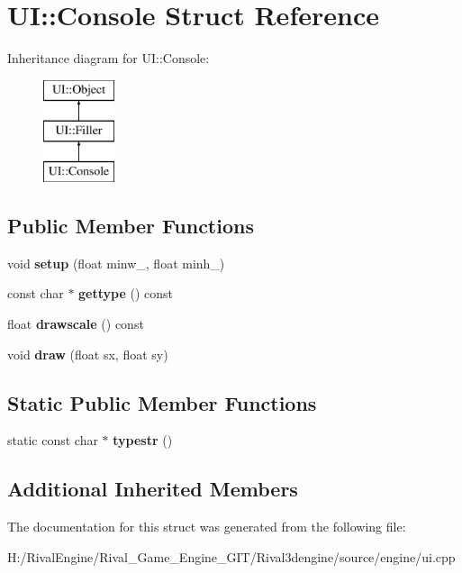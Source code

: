 \hypertarget{struct_u_i_1_1_console}{}\section{UI\+:\+:Console Struct Reference}
\label{struct_u_i_1_1_console}
Inheritance diagram for UI\+:\+:Console\+:\begin{figure}[H]
\begin{center}
\leavevmode
\includegraphics[height=3.000000cm]{struct_u_i_1_1_console}
\end{center}
\end{figure}
\subsection*{Public Member Functions}
\begin{DoxyCompactItemize}
\item 
\mbox{\label{struct_u_i_1_1_console_a6a0e13ebd65794e88fe84ae63133dd8f}} 
void {\bfseries setup} (float minw\+\_, float minh\+\_)
\item 
\mbox{\label{struct_u_i_1_1_console_a2278d17e86b8c287bafa6417cbde8296}} 
const char $\ast$ {\bfseries gettype} () const
\item 
\mbox{\label{struct_u_i_1_1_console_abe603f224bd7e4677519da82c592cc89}} 
float {\bfseries drawscale} () const
\item 
\mbox{\label{struct_u_i_1_1_console_a55e6d17b17da10a211067d1ec0db89b1}} 
void {\bfseries draw} (float sx, float sy)
\end{DoxyCompactItemize}
\subsection*{Static Public Member Functions}
\begin{DoxyCompactItemize}
\item 
\mbox{\label{struct_u_i_1_1_console_a1738f5f02a921cab287ca603be4d6598}} 
static const char $\ast$ {\bfseries typestr} ()
\end{DoxyCompactItemize}
\subsection*{Additional Inherited Members}


The documentation for this struct was generated from the following file\+:\begin{DoxyCompactItemize}
\item 
H\+:/\+Rival\+Engine/\+Rival\+\_\+\+Game\+\_\+\+Engine\+\_\+\+G\+I\+T/\+Rival3dengine/source/engine/ui.\+cpp\end{DoxyCompactItemize}

